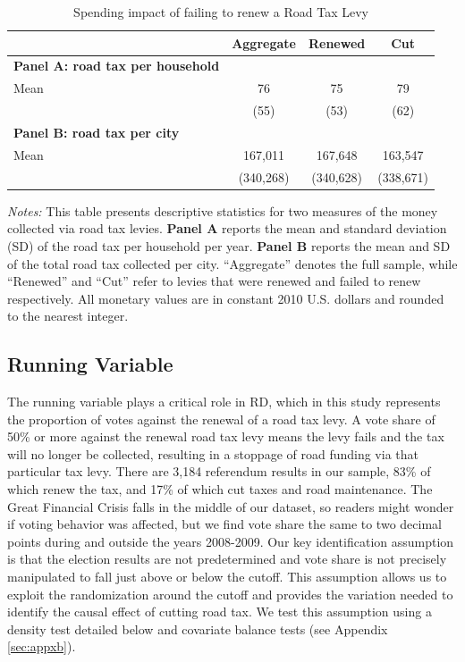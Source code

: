 \begin{table}[H]
    \centering
    \caption{Spending impact of failing to renew a Road Tax Levy}
    \label{tab:levy_stats}
    \begin{threeparttable}
    \begin{tabular}{p{5cm}ccc}
    \hline\hline
    & \textbf{Aggregate} & \textbf{Renewed} & \textbf{Cut} \\
    \hline
    \textbf{Panel A: road tax per household} \\
    Mean & 76 & 75 & 79 \\
       & (55) & (53) & (62) \\
    \hline
    \textbf{Panel B: road tax per city} \\
    Mean & 167,011 & 167,648 & 163,547 \\
       & (340,268) & (340,628) & (338,671) \\
    \hline\hline
    \end{tabular}
    \begin{tablenotes}[flushleft]
      \footnotesize
      \item \textit{Notes:}
      This table presents descriptive statistics for two measures of the money collected via road tax levies.
      \textbf{Panel A} reports the mean and standard deviation (SD) of the road tax per household per year.
      \textbf{Panel B} reports the mean and SD of the total road tax collected per city.
      “Aggregate” denotes the full sample, while “Renewed” and “Cut” refer to levies that were renewed and failed to renew respectively.
      All monetary values are in constant 2010 U.S. dollars and rounded to the nearest integer.
    \end{tablenotes}
    \end{threeparttable}
\end{table}

\subsection{Running Variable}

The running variable plays a critical role in RD, which in this study represents the proportion of votes against the renewal of a road tax levy. A vote share of 50\% or more against the renewal road tax levy means the levy fails and the tax will no longer be collected, resulting in a stoppage of road funding via that particular tax levy. There are 3,184 referendum results in our sample, 83\% of which renew the tax, and 17\% of which cut taxes and road maintenance. The Great Financial Crisis falls in the middle of our dataset, so readers might wonder if voting behavior was affected, but we find vote share the same to two decimal points during and outside the years 2008-2009. Our key identification assumption is that the election results are not predetermined and vote share is not precisely manipulated to fall just above or below the cutoff. This assumption allows us to exploit the randomization around the cutoff and provides the variation needed to identify the causal effect of cutting road tax. We test this assumption using a density test detailed below and covariate balance tests (see Appendix \ref{sec:appxb}).

